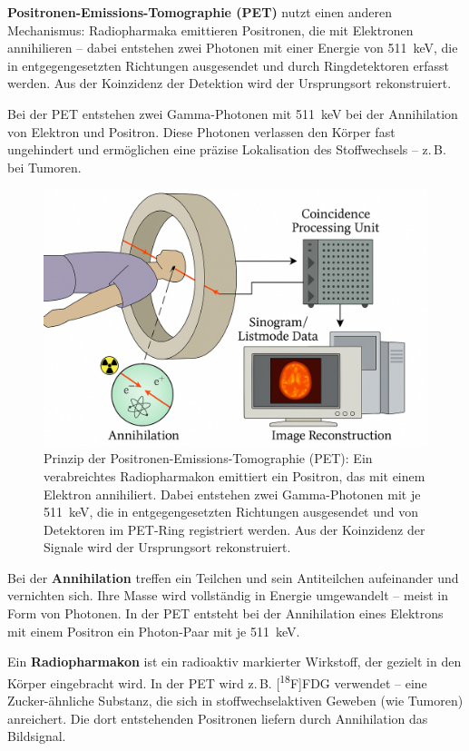 \textbf{Positronen-Emissions-Tomographie (PET)} nutzt einen anderen Mechanismus: Radiopharmaka emittieren Positronen, die mit Elektronen annihilieren – dabei entstehen zwei Photonen mit einer Energie von \SI{511}{keV}, die in entgegengesetzten Richtungen ausgesendet und durch Ringdetektoren erfasst werden. Aus der Koinzidenz der Detektion wird der Ursprungsort rekonstruiert.
\medskip
\begin{tcolorbox}[physikbox, title=Photonen bei der PET]
	\label{box:PET}
	\small
	Bei der PET entstehen zwei Gamma-Photonen mit \SI{511}{keV} bei der Annihilation von Elektron und Positron. Diese Photonen verlassen den Körper fast ungehindert und ermöglichen eine präzise Lokalisation des Stoffwechsels – z.\,B. bei Tumoren.
\end{tcolorbox}
\begin{figure}[H]
	\centering
	\includegraphics[width=0.85\linewidth]{bilder/petscan.png}
	\caption{Prinzip der Positronen-Emissions-Tomographie (PET): Ein verabreichtes Radiopharmakon emittiert ein Positron, das mit einem Elektron annihiliert. Dabei entstehen zwei Gamma-Photonen mit je \SI{511}{keV}, die in entgegengesetzten Richtungen ausgesendet und von Detektoren im PET-Ring registriert werden. Aus der Koinzidenz der Signale wird der Ursprungsort rekonstruiert.}
	\label{fig:pet_prinzip}
\end{figure}
\begin{tcolorbox}[didaktikbox, title=Begriffserklärung: Annihilation]
	\label{box:annihilation}
	\small
	Bei der \textbf{Annihilation} treffen ein Teilchen und sein Antiteilchen aufeinander und vernichten sich. Ihre Masse wird vollständig in Energie umgewandelt – meist in Form von Photonen. In der PET entsteht bei der Annihilation eines Elektrons mit einem Positron ein Photon-Paar mit je \SI{511}{keV}.
\end{tcolorbox}
\medskip
\begin{tcolorbox}[didaktikbox, title=Begriffserklärung: Radiopharmakon]
	\label{box:radiopharmakon}
	\small
	Ein \textbf{Radiopharmakon} ist ein radioaktiv markierter Wirkstoff, der gezielt in den Körper eingebracht wird. In der PET wird z.\,B. [\textsuperscript{18}F]FDG verwendet – eine Zucker-ähnliche Substanz, die sich in stoffwechselaktiven Geweben (wie Tumoren) anreichert. Die dort entstehenden Positronen liefern durch Annihilation das Bildsignal.
\end{tcolorbox}

